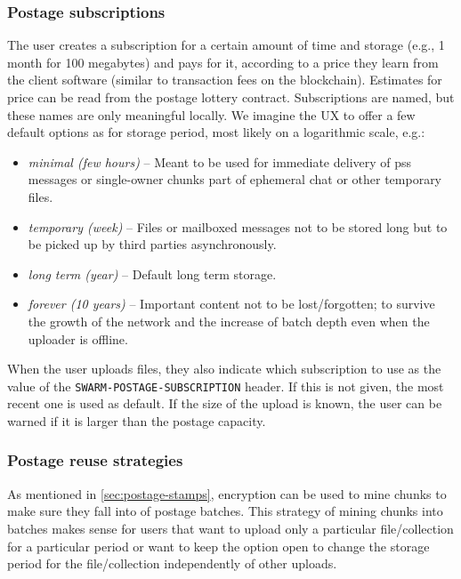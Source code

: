 \subsubsection{Postage subscriptions}

The user creates a subscription for a certain amount of time and storage (e.g., 1 month for 100 megabytes) and pays for it, according to a price they learn from the client software (similar to transaction fees on the blockchain). Estimates for price can be read from the postage lottery contract. Subscriptions are named, but these names are only meaningful locally. We imagine the UX to offer a few default options as for storage period, most likely on a logarithmic scale, e.g.: 

\begin{itemize}
\item \emph{minimal (few hours)} -- Meant to be used for immediate delivery of pss messages or single-owner chunks part of ephemeral chat or other temporary files.
\item \emph{temporary (week)} -- Files or mailboxed messages not to be stored long but to be picked up by third parties asynchronously.
\item \emph{long term (year)} -- Default long term storage. 
\item \emph{forever (10 years)} -- Important content not to be lost/forgotten; to survive the growth of the network and the increase of batch depth even when the uploader is offline.
\end{itemize}

When the user uploads files, they also indicate which subscription to use as the value of the \lstinline{SWARM-POSTAGE-SUBSCRIPTION} header. If this is not given, the most recent one is used as default. If the size of the upload is known, the user can be warned if it is larger than the postage capacity. 

\subsubsection{Postage reuse strategies}

As mentioned in \ref{sec:postage-stamps}, encryption can be used to mine chunks to make sure they fall into  of postage batches. This strategy of mining chunks into batches makes sense for users that want to upload only a particular file/collection for a particular period or want to keep the option open to change the storage period for the file/collection independently of other uploads.

